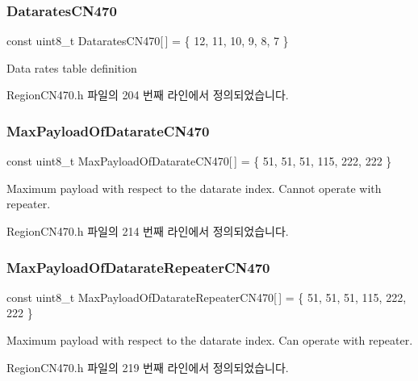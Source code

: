 \subsubsection{\texorpdfstring{Datarates\+C\+N470}{DataratesCN470}}
{\footnotesize\ttfamily const uint8\+\_\+t Datarates\+C\+N470\mbox{[}$\,$\mbox{]} = \{ 12, 11, 10, 9, 8, 7 \}\hspace{0.3cm}{\ttfamily [static]}}

Data rates table definition 

Region\+C\+N470.\+h 파일의 204 번째 라인에서 정의되었습니다.

\mbox{\label{group___r_e_g_i_o_n_c_n470_gabe561c63689717791704a2c3c428403b}} 
\subsubsection{\texorpdfstring{Max\+Payload\+Of\+Datarate\+C\+N470}{MaxPayloadOfDatarateCN470}}
{\footnotesize\ttfamily const uint8\+\_\+t Max\+Payload\+Of\+Datarate\+C\+N470\mbox{[}$\,$\mbox{]} = \{ 51, 51, 51, 115, 222, 222 \}\hspace{0.3cm}{\ttfamily [static]}}

Maximum payload with respect to the datarate index. Cannot operate with repeater. 

Region\+C\+N470.\+h 파일의 214 번째 라인에서 정의되었습니다.

\mbox{\label{group___r_e_g_i_o_n_c_n470_gade3666273b2cd234202b56bc4dd2e599}} 
\subsubsection{\texorpdfstring{Max\+Payload\+Of\+Datarate\+Repeater\+C\+N470}{MaxPayloadOfDatarateRepeaterCN470}}
{\footnotesize\ttfamily const uint8\+\_\+t Max\+Payload\+Of\+Datarate\+Repeater\+C\+N470\mbox{[}$\,$\mbox{]} = \{ 51, 51, 51, 115, 222, 222 \}\hspace{0.3cm}{\ttfamily [static]}}

Maximum payload with respect to the datarate index. Can operate with repeater. 

Region\+C\+N470.\+h 파일의 219 번째 라인에서 정의되었습니다.

